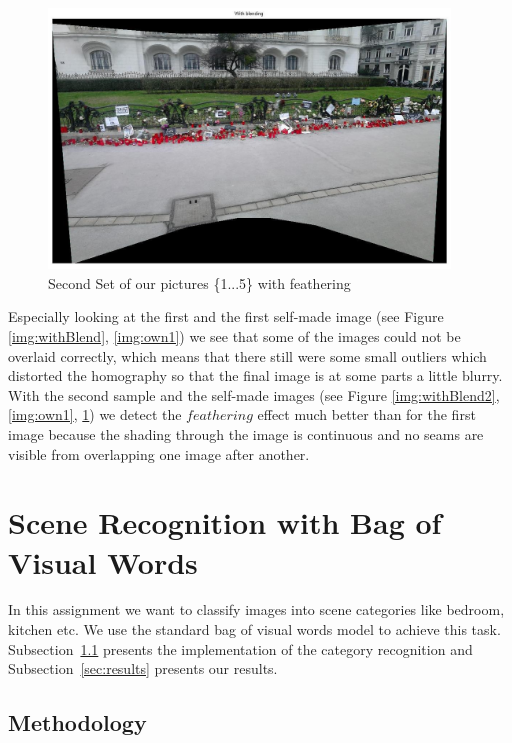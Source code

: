 \documentclass[subfigure,epsfig,fleqn,float,numbers=noenddot]{scrartcl}
\begin{document}
\begin{figure}[H]
		\centering
		\includegraphics[width=0.95\textwidth]{./img/charlie.jpg}
		\caption{Second Set of our pictures \{1...5\} with feathering}
		\label{img:own2}
\end{figure}

Especially looking at the first and the first self-made image (see Figure \ref{img:withBlend}, \ref{img:own1}) we see that some of the images could not be overlaid correctly, which means that there still were some small outliers which distorted the homography so that the final image is at some parts a little blurry. 
With the second sample and the self-made images (see Figure \ref{img:withBlend2}, \ref{img:own1}, \ref{img:own2}) we detect the $feathering$ effect much better than for the first image because the shading through the image is continuous and no seams are visible from overlapping one image after another. 


\section{Scene Recognition with Bag of Visual Words}
\label{sec:2}

In this assignment we want to classify images into scene categories like bedroom, kitchen etc. 
We use the standard bag of visual words model to achieve this task. Subsection~\ref{sec:methodology} presents the implementation of the category recognition and Subsection~\ref{sec:results} presents our results.

\subsection{Methodology}
\label{sec:methodology}
\end{document}
